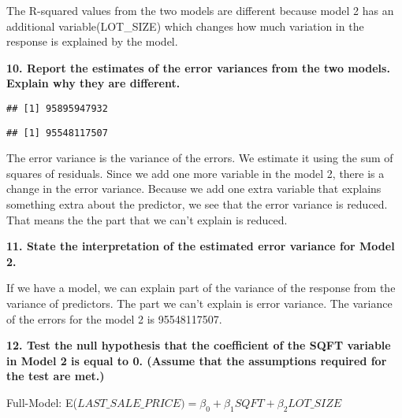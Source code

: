 \documentclass[
]{article}
\newenvironment{Shaded}{\begin{snugshade}}{\end{snugshade}}
\newcommand{\DecValTok}[1]{\textcolor[rgb]{0.00,0.00,0.81}{#1}}
\newcommand{\FunctionTok}[1]{\textcolor[rgb]{0.00,0.00,0.00}{#1}}
\newcommand{\NormalTok}[1]{#1}
\newcommand{\SpecialCharTok}[1]{\textcolor[rgb]{0.00,0.00,0.00}{#1}}
\begin{document}
The R-squared values from the two models are different because model 2
has an additional variable(LOT\_SIZE) which changes how much variation
in the response is explained by the model.

\textbf{10. Report the estimates of the error variances from the two
models. Explain why they are different.}

\begin{Shaded}
\end{Shaded}

\begin{verbatim}
## [1] 95895947932
\end{verbatim}

\begin{Shaded}
\end{Shaded}

\begin{verbatim}
## [1] 95548117507
\end{verbatim}

The error variance is the variance of the errors. We estimate it using
the sum of squares of residuals. Since we add one more variable in the
model 2, there is a change in the error variance. Because we add one
extra variable that explains something extra about the predictor, we see
that the error variance is reduced. That means the the part that we
can't explain is reduced.

\textbf{11. State the interpretation of the estimated error variance for
Model 2.}

If we have a model, we can explain part of the variance of the response
from the variance of predictors. The part we can't explain is error
variance. The variance of the errors for the model 2 is 95548117507.

\textbf{12. Test the null hypothesis that the coefficient of the SQFT
variable in Model 2 is equal to 0. (Assume that the assumptions required
for the test are met.)}

Full-Model:
E(\(LAST\_SALE\_PRICE)=\beta_0 + \beta_1 SQFT + \beta_2 LOT\_SIZE\)
\end{document}
